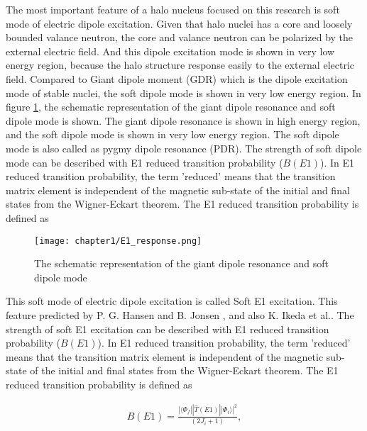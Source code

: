 The most important feature of a halo nucleus focused on this research is soft mode of electric dipole excitation. Given that halo nuclei has a core and loosely bounded valance neutron, the core and valance neutron can be polarized by the external electric field. And this dipole excitation mode is shown in very low energy region, because the halo structure response easily to the external electric field. Compared to Giant dipole moment (GDR) which is the dipole excitation mode of stable nuclei, the soft dipole mode is shown in very low energy region. In figure \ref{fig:E1_response}, the schematic representation of the giant dipole resonance and soft dipole mode is shown. The giant dipole resonance is shown in high energy region, and the soft dipole mode is shown in very low energy region. The soft dipole mode is also called as pygmy dipole resonance (PDR). 
The strength of soft dipole mode can be described with E1 reduced transition probability ($B(E1)$). In E1 reduced transition probability, the term 'reduced' means that the transition matrix element is independent of the magnetic sub-state of the initial and final states from the Wigner-Eckart theorem. The E1 reduced transition probability is defined as

\begin{figure}
    \centering
    \texttt{[image: chapter1/E1\_response.png]}
    \caption{The schematic representation of the giant dipole resonance and soft dipole mode \cite{Nakamura17}}
    \label{fig:E1_response}
\end{figure}

This soft mode of electric dipole excitation is called Soft E1 excitation. This feature predicted by P. G. Hansen and B. Jonsen \cite{HansenandJonson}, and also K. Ikeda et al.\cite{Ikeda}. The strength of soft E1 excitation can be described with E1 reduced transition probability ($B(E1)$). In E1 reduced transition probability, the term 'reduced' means that the transition matrix element is independent of the magnetic sub-state of the initial and final states from the Wigner-Eckart theorem. The E1 reduced transition probability is defined as

\begin{align}
    B(E1) = \frac{|\langle \Phi_f ||\hat{T}(E1)|| \Phi_i\rangle|^2}{(2J_i + 1)},
\end{align}

